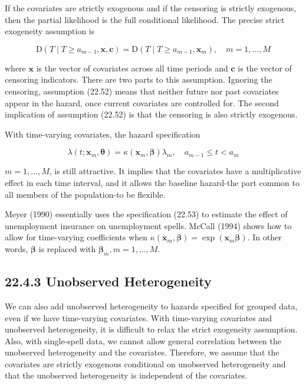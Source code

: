 \documentclass[10pt]{article}
\begin{document}
If the covariates are strictly exogenous and if the censoring is strictly exogenous, then the partial likelihood is the full conditional likelihood. The precise strict exogeneity assumption is


\begin{equation*}
\mathrm{D}\left(T \mid T \geq a_{m-1}, \mathbf{x}, \mathbf{c}\right)=\mathrm{D}\left(T \mid T \geq a_{m-1}, \mathbf{x}_{m}\right), \quad m=1, \ldots, M \tag{22.52}
\end{equation*}


where $\mathbf{x}$ is the vector of covariates across all time periods and $\mathbf{c}$ is the vector of censoring indicators. There are two parts to this assumption. Ignoring the censoring, assumption (22.52) means that neither future nor past covariates appear in the hazard, once current covariates are controlled for. The second implication of assumption (22.52) is that the censoring is also strictly exogenous.

With time-varying covariates, the hazard specification


\begin{equation*}
\lambda\left(t ; \mathbf{x}_{m}, \boldsymbol{\theta}\right)=\kappa\left(\mathbf{x}_{m}, \boldsymbol{\beta}\right) \lambda_{m}, \quad a_{m-1} \leq t<a_{m} \tag{22.53}
\end{equation*}


$m=1, \ldots, M$, is still attractive. It implies that the covariates have a multiplicative effect in each time interval, and it allows the baseline hazard-the part common to all members of the population-to be flexible.

Meyer (1990) essentially uses the specification (22.53) to estimate the effect of unemployment insurance on unemployment spells. McCall (1994) shows how to allow for time-varying coefficients when $\kappa\left(\mathbf{x}_{m}, \boldsymbol{\beta}\right)=\exp \left(\mathbf{x}_{m} \boldsymbol{\beta}\right)$. In other words, $\boldsymbol{\beta}$ is replaced with $\boldsymbol{\beta}_{m}, m=1, \ldots, M$.

\subsection*{22.4.3 Unobserved Heterogeneity}
We can also add unobserved heterogeneity to hazards specified for grouped data, even if we have time-varying covariates. With time-varying covariates and unobserved heterogeneity, it is difficult to relax the strict exogeneity assumption. Also, with single-spell data, we cannot allow general correlation between the unobserved heterogeneity and the covariates. Therefore, we assume that the covariates are strictly exogenous conditional on unobserved heterogeneity and that the unobserved heterogeneity is independent of the covariates.
\end{document}
